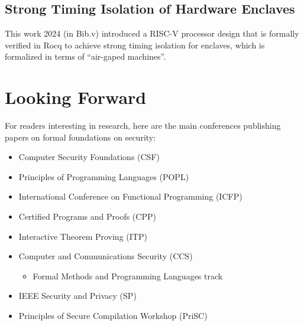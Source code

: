 \documentclass[12pt]{report}
\begin{document}
\subsection{Strong Timing Isolation of Hardware Enclaves}



 This work    2024 (in Bib.v) introduced a RISC-V processor design that is
    formally verified in Rocq to achieve strong timing isolation for enclaves,
    which is formalized in terms of ``air-gaped machines''. 
\begin{coqdoccode}
\coqdocemptyline
\end{coqdoccode}
\section{Looking Forward}



 For readers interesting in research, here are the main conferences
    publishing papers on formal foundations on security:

\begin{itemize}
\item  Computer Security Foundations (CSF)

\item  Principles of Programming Languages (POPL)

\item  International Conference on Functional Programming (ICFP)

\item  Certified Programs and Proofs (CPP)

\item  Interactive Theorem Proving (ITP)

\item  Computer and Communications Security (CCS)

\begin{itemize}
\item  Formal Methods and Programming Languages track

\end{itemize}

\item  IEEE Security and Privacy (SP)

\item  Principles of Secure Compilation Workshop (PriSC) 

\end{itemize}
\begin{coqdoccode}
\coqdocemptyline
\end{coqdoccode}
\end{document}
